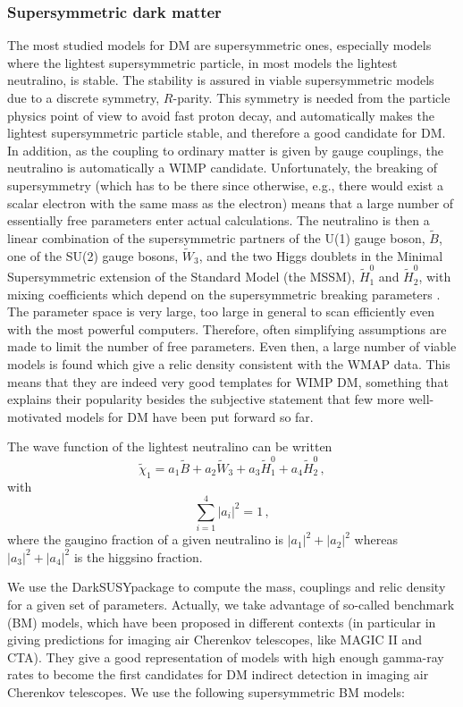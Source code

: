 \documentclass[10pt,aps,pra,reprint,amsmath,amsfonts,amssymb,showpacs,nofootinbib,floatfix]{revtex4-1}
\newcommand{\ds}{{\sc DarkSUSY}}
\begin{document}
\subsubsection{Supersymmetric dark matter}
The most studied models for DM are supersymmetric ones, especially
models where the lightest supersymmetric particle, in most models the
lightest neutralino, is stable. The stability is assured in viable
supersymmetric models due to a discrete symmetry, $R$-parity. This
symmetry is needed from the particle physics point of view to avoid
fast proton decay, and automatically makes the lightest supersymmetric
particle stable, and therefore a good candidate for DM. In addition,
as the coupling to ordinary matter is given by gauge couplings, the
neutralino is automatically a WIMP candidate. Unfortunately, the
breaking of supersymmetry (which has to be there since otherwise,
e.g., there would exist a scalar electron with the same mass as the
electron) means that a large number of essentially free parameters
enter actual calculations.  The neutralino is then a linear
combination of the supersymmetric partners of the U(1) gauge boson,
$\tilde B$, one of the SU(2) gauge bosons, $\tilde W_3$, and the two
Higgs doublets in the Minimal Supersymmetric extension of the Standard
Model (the MSSM), $\tilde H_1^0$ and $\tilde H_2^0$, with mixing
coefficients which depend on the supersymmetric breaking parameters
\cite{1984NuPhB.238..453E}. The parameter space is very large, too
large in general to scan efficiently even with the most powerful
computers. Therefore, often simplifying assumptions are made to limit
the number of free parameters. Even then, a large number of viable
models is found which give a relic density consistent with the WMAP
data. This means that they are indeed very good templates for WIMP DM,
something that explains their popularity besides the subjective
statement that few more well-motivated models for DM have been put forward
so far.

The wave function of the lightest neutralino can be written
\begin{equation}
\tilde\chi_1=a_1\tilde B+a_2\tilde W_3+a_3 \tilde H_1^0+a_4\tilde H_2^0\,,
\end{equation}
with 
\begin{equation}
\sum_{i=1}^4 |a_i|^2=1\,,
\end{equation}
where the gaugino fraction of a given neutralino is $|a_1|^2+|a_2|^2$
whereas $|a_3|^2+|a_4|^2$ is the higgsino fraction.

We use the \ds package \cite{ds} to compute the mass, couplings and
relic density for a given set of parameters.  Actually, we take
advantage of so-called benchmark (BM) models, which have been proposed
in different contexts (in particular in \cite{Bringmann:2008kj} giving
predictions for imaging air Cherenkov telescopes, like MAGIC II and
CTA). They give a good representation of models with high enough
gamma-ray rates to become the first candidates for DM indirect
detection in imaging air Cherenkov telescopes. We use the following
supersymmetric BM models:
\end{document}
